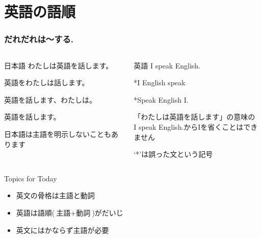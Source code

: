 \documentclass[aspectratio=169,xcolor={dvipsnames,table}]{beamer}
\begin{document}
\section{英語の語順}
\begin{frame}[plain]\frametitle{だれだれは〜する.}

\begin{columns}
\begin{column}[t]{.45\textwidth}
\begin{block}{日本語}
わたしは英語を話します。\pause

英語をわたしは話します。\pause

英語を話します、わたしは。\pause

英語を話します。

{\scriptsize 日本語は主語を明示しないこともあります}
\end{block}
\end{column}
\pause
\begin{column}[t]{.45\textwidth}
\begin{alertblock}{英語}
I speak English.\pause

\mbox{}\hspace{75pt}*I English speak\pause

\mbox{}\hspace{75pt}*Speak English I.\pause

{\scriptsize 「わたしは英語を話します」の意味の\\I speak English.からIを省くことはできません}

\scriptsize
\mbox{}\hspace{75pt}%
`*'は誤った文という記号　
\end{alertblock}
\end{column}
\end{columns}


\bigskip
\pause
\begin{exampleblock}{Topics for Today}
\begin{itemize}
 \item   英文の骨格は主語と動詞
 \item   英語は語順($\text{主語}+\text{動詞}$)がだいじ
 \item   英文にはかならず主語が必要
\end{itemize}
     \end{exampleblock}
\end{frame}
\end{document}
